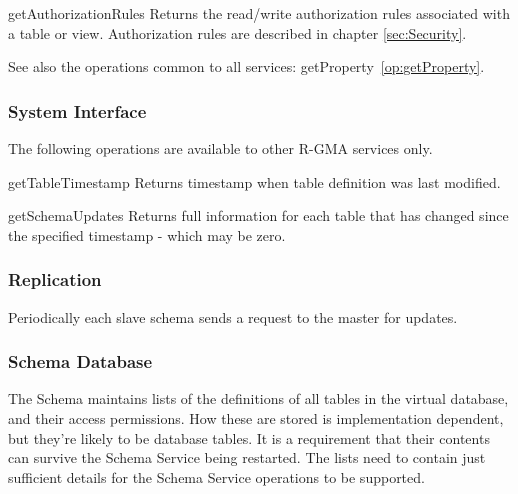\begin{method}{getAuthorizationRules}
\desc Returns the read/write authorization rules associated with a table or view.
Authorization rules are described in chapter \ref{sec:Security}.
\end{method}

See also the operations common to all services:
getProperty~\ref{op:getProperty}.

\subsubsection{System Interface}
The following operations are available to other R-GMA services only.

\begin{method}{getTableTimestamp}
\desc Returns timestamp when table definition was last modified.
\end{method}


\begin{method}{getSchemaUpdates}
\desc Returns full information for each table that has changed since the
specified timestamp - which may be zero.
\end{method}
                                                                                
\subsubsection{Replication}\label{sec:SchemaReplication}
Periodically each slave schema sends a request to the master for updates.

\subsubsection{Schema Database}

The Schema maintains lists of the definitions of all tables in the virtual
database, and their access permissions. How these are stored is implementation
dependent, but they're likely to be database tables. It is a requirement that
their contents can survive the Schema Service being restarted. The lists need
to contain just sufficient details for the Schema Service operations to be
supported.

